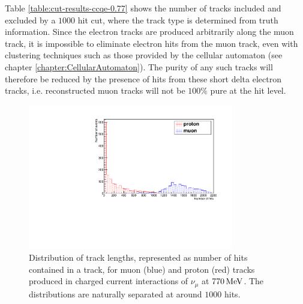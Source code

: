 Table \ref{table:cut-results-ccqe-0.77} shows the number of tracks included and excluded by a $1000$ hit cut, where the track type is determined from truth information. Since the electron tracks are produced arbitrarily along the muon track, it is impossible to eliminate electron hits from the muon track, even with clustering techniques such as those provided by the cellular automaton (see chapter \ref{chapter:CellularAutomaton}). The purity of any such tracks will therefore be reduced by the presence of hits from these short delta electron tracks, i.e. reconstructed muon tracks will not be $100\%$ pure at the hit level.


\begin{figure}
\centering
\includegraphics[angle=-90,width=0.8\textwidth]{chapters/particleid_images/particle-lengths-ccqe-770}
\caption[Track length distribution for $\mu$ and $p$ from $770\MeV$ neutrinos (CCQE)]{\label{fig:ccqe-track-lengths-770MeV}Distribution of track lengths, represented as number of hits contained in a track, for muon (blue) and proton (red) tracks produced in charged current interactions of $\nu_\mu$ at $770\MeV$. The distributions are naturally separated at around $1000$ hits.}
\end{figure}

